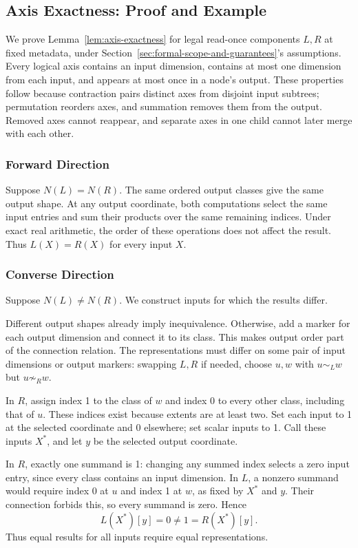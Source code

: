 \subsection{Axis Exactness: Proof and Example}
\label{app:axis-exactness}
We prove Lemma~\ref{lem:axis-exactness} for legal read-once components $L,R$
at fixed metadata, under Section~\ref{sec:formal-scope-and-guarantees}'s assumptions.
Every logical axis contains an input dimension, contains at most one dimension from
each input, and appears at most once in a node's output. These properties
follow because contraction pairs distinct axes from disjoint input subtrees;
permutation reorders axes, and summation removes them from the output.
Removed axes cannot reappear, and separate axes in one child cannot later
merge with each other.

\subsubsection{Forward Direction}
Suppose $N(L)=N(R)$. The same ordered output classes give the same output
shape. At any output coordinate, both computations select the same input
entries and sum their products over the same remaining indices. Under
exact real arithmetic, the order of these operations does not affect the
result. Thus $L(X)=R(X)$ for every input $X$.

\subsubsection{Converse Direction}
Suppose $N(L)\ne N(R)$. We construct inputs for which the results differ.

Different output shapes already imply inequivalence. Otherwise, add a marker
for each output dimension and connect it to its class. This makes output
order part of the connection relation. The representations must differ on
some pair of input dimensions or output markers: swapping $L,R$ if needed, choose $u,w$ with
$u\sim_L w$ but $u\not\sim_R w$.

In $R$, assign index 1 to the class of $w$ and index 0 to every other class,
including that of $u$. These indices exist because extents are at least two.
Set each input to 1 at the selected coordinate and 0 elsewhere; set scalar
inputs to 1. Call these inputs $X^*$, and let $y$ be the selected output
coordinate.

In $R$, exactly one summand is 1: changing any summed index selects a zero
input entry, since every class contains an input dimension. In $L$, a nonzero
summand would require index 0 at $u$ and index 1 at $w$, as fixed by $X^*$
and $y$. Their connection forbids this, so every summand is zero. Hence
\begin{equation}
 L(X^*)[y]=0\ne1=R(X^*)[y].
\end{equation}
Thus equal results for all inputs require equal representations.

